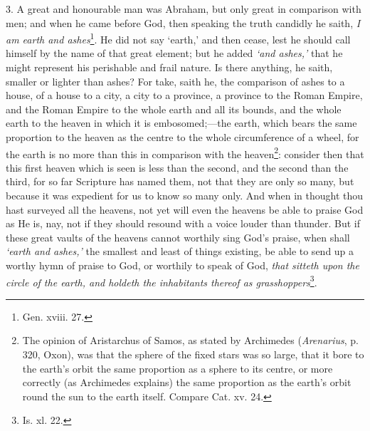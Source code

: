 3. A great and honourable man was Abraham, but only great in comparison with men; and when he came before God, then speaking the truth candidly he saith, \emph{I am earth and ashes}\footnote{Gen. xviii. 27.}. He did not say ‘earth,’ and then cease, lest he should call himself by the name of that great element; but he added \emph{‘and ashes,’} that he might represent his perishable and frail nature. Is there anything, he saith, smaller or lighter than ashes? For take, saith he, the comparison of ashes to a house, of a house to a city, a city to a province, a province to the Roman Empire, and the Roman Empire to the whole earth and all its bounds, and the whole earth to the heaven in which it is embosomed;—the earth, which bears the same proportion to the heaven as the centre to the whole circumference of a wheel, for the earth is no more than this in comparison with the heaven\footnote{The opinion of Aristarchus of Samos, as stated by Archimedes (\emph{Arenarius}, p. 320, Oxon), was that the sphere of the fixed stars was so large, that it bore to the earth’s orbit the same proportion as a sphere to its centre, or more correctly (as Archimedes explains) the same proportion as the earth’s orbit round the sun to the earth itself. Compare Cat. xv. 24.}: consider then that this first heaven which is seen is less than the second, and the second than the third, for so far Scripture has named them, not that they are only so many, but because it was expedient for us to know so many only. And when in thought thou hast surveyed all the heavens, not yet will even the heavens be able to praise God as He is, nay, not if they should resound with a voice louder than thunder. But if these great vaults of the heavens cannot worthily sing God’s praise, when shall \emph{‘earth and ashes,’} the smallest and least of things existing, be able to send up a worthy hymn of praise to God, or worthily to speak of God, \emph{that sitteth upon the circle of the earth, and holdeth the inhabitants thereof as grasshoppers}\footnote{Is. xl. 22.}.

